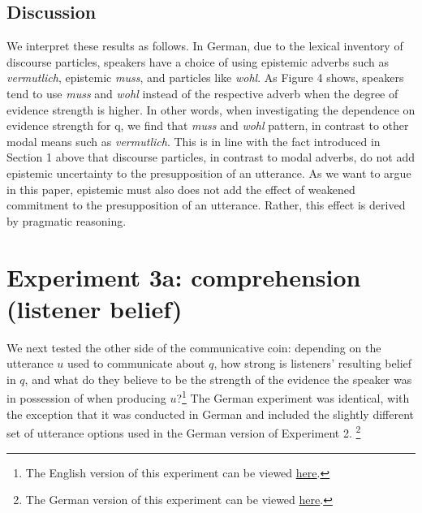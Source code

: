\documentclass[11pt]{article}
\begin{document}
\subsection{Discussion}
We interpret these results as follows. In German, due to the lexical inventory of discourse particles, speakers have a choice of using epistemic adverbs such as \emph{vermutlich}, epistemic \emph{muss}, and particles like \emph{wohl}. As Figure 4 shows, speakers tend to use \emph{muss} and \emph{wohl} instead of the respective adverb when the degree of evidence strength is higher. In other words, when investigating the dependence on evidence strength for q, we find that \emph{muss} and \emph{wohl} pattern, in contrast to other modal means such as \emph{vermutlich}. This is in line with the fact introduced in Section 1 above that discourse particles, in contrast to modal adverbs, do not add epistemic uncertainty to the presupposition of an utterance. As we want to argue in this paper, epistemic must also does not add the effect of weakened commitment to the presupposition of an utterance. Rather, this effect is derived by pragmatic reasoning.

\section{Experiment 3a: comprehension (listener belief)}


We next tested the other side of the communicative coin: depending on the utterance $u$ used to communicate about $q$, how strong is listeners' resulting belief in $q$, and what do they believe to be the strength of the evidence the speaker was in possession of when producing $u$?\footnote{The English version of this experiment can be viewed \href{http://stanford.edu/~jdegen/72_modals_comprehension_evidence_room/modals.html}{here}.} The German experiment was identical, with the exception that it was conducted in German and included the slightly different set of utterance options used in the German version of Experiment 2. \footnote{The German version of this experiment can be viewed \href{http://web.stanford.edu/~jdegen/cgi-bin/2_dp_comprehension_listenerbelief/modals.html}{here}.}
\end{document}
